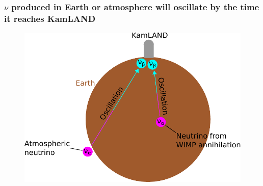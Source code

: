 \documentclass{beamer}
\begin{document}
\begin{frame}
	\frametitle{$\nu$ produced in Earth or atmosphere will oscillate by the time
	it reaches KamLAND}
	\begin{figure}
		\centering
			\includegraphics[width=0.85\linewidth]{nu_oscillation_in_earth.pdf}
	\end{figure}
\end{frame}
\end{document}
